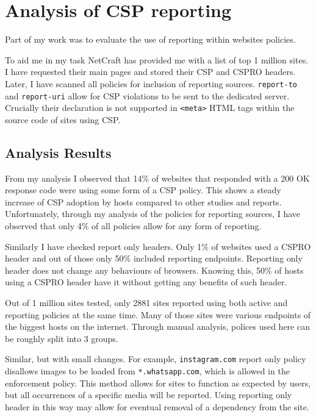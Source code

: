 \begin{description}
\begin{figure}

	\label{code:initial}
\end{figure}

\section{Analysis of CSP reporting}

Part of my work was to evaluate the use of reporting within websites policies.

To aid me in my task NetCraft has provided me with a list of top 1 million sites.
I have requested their main pages and stored their CSP and CSPRO headers.
Later, I have scanned all policies for inclusion of reporting sources.
\texttt{report-to} and \texttt{report-uri} allow for CSP violations to be sent to the dedicated server.
Crucially their declaration is not supported in \texttt{<meta>} HTML tags within the source code of sites using CSP.

\subsection{Analysis Results}

From my analysis I observed that 14\% of websites that responded with a 200 OK response code were using some form of a CSP policy.
This shows a steady increase of CSP adoption by hosts compared to other studies and reports.
Unfortunately, through my analysis of the policies for reporting sources, I have observed that only 4\% of all policies allow for any form of reporting.

Similarly I have checked report only headers. 
Only 1\% of websites used a CSPRO header and out of those only 50\% included reporting endpoints.
Reporting only header does not change any behaviours of browsers. 
Knowing this, 50\% of hosts using a CSPRO header have it without getting any benefits of such header.

Out of 1 million sites tested, only 2881 sites reported using both active and reporting policies at the same time.
Many of those sites were various endpoints of the biggest hosts on the internet.
Through manual analysis, polices used here can be roughly split into 3 groups.

Similar, but with small changes.
For example, \texttt{instagram.com} report only policy disallows images to be loaded from \texttt{*.whatsapp.com}, which is allowed in the enforcement policy.
This method allows for sites to function as expected by users, but all occurrences of a specific media will be reported.
Using reporting only header in this way may allow for eventual removal of a dependency from the site.


\end{description}
